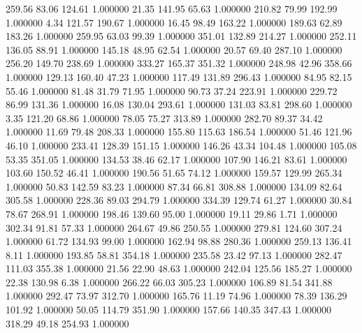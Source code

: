     259.56     83.06    124.61  1.000000
     21.35    141.95     65.63  1.000000
    210.82     79.99    192.99  1.000000
      4.34    121.57    190.67  1.000000
     16.45     98.49    163.22  1.000000
    189.63     62.89    183.26  1.000000
    259.95     63.03     99.39  1.000000
    351.01    132.89    214.27  1.000000
    252.11    136.05     88.91  1.000000
    145.18     48.95     62.54  1.000000
     20.57     69.40    287.10  1.000000
    256.20    149.70    238.69  1.000000
    333.27    165.37    351.32  1.000000
    248.98     42.96    358.66  1.000000
    129.13    160.40     47.23  1.000000
    117.49    131.89    296.43  1.000000
     84.95     82.15     55.46  1.000000
     81.48     31.79     71.95  1.000000
     90.73     37.24    223.91  1.000000
    229.72     86.99    131.36  1.000000
     16.08    130.04    293.61  1.000000
    131.03     83.81    298.60  1.000000
      3.35    121.20     68.86  1.000000
     78.05     75.27    313.89  1.000000
    282.70     89.37     34.42  1.000000
     11.69     79.48    208.33  1.000000
    155.80    115.63    186.54  1.000000
     51.46    121.96     46.10  1.000000
    233.41    128.39    151.15  1.000000
    146.26     43.34    104.48  1.000000
    105.08     53.35    351.05  1.000000
    134.53     38.46     62.17  1.000000
    107.90    146.21     83.61  1.000000
    103.60    150.52     46.41  1.000000
    190.56     51.65     74.12  1.000000
    159.57    129.99    265.34  1.000000
     50.83    142.59     83.23  1.000000
     87.34     66.81    308.88  1.000000
    134.09     82.64    305.58  1.000000
    228.36     89.03    294.79  1.000000
    334.39    129.74     61.27  1.000000
     30.84     78.67    268.91  1.000000
    198.46    139.60     95.00  1.000000
     19.11     29.86      1.71  1.000000
    302.34     91.81     57.33  1.000000
    264.67     49.86    250.55  1.000000
    279.81    124.60    307.24  1.000000
     61.72    134.93     99.00  1.000000
    162.94     98.88    280.36  1.000000
    259.13    136.41      8.11  1.000000
    193.85     58.81    354.18  1.000000
    235.58     23.42     97.13  1.000000
    282.47    111.03    355.38  1.000000
     21.56     22.90     48.63  1.000000
    242.04    125.56    185.27  1.000000
     22.38    130.98      6.38  1.000000
    266.22     66.03    305.23  1.000000
    106.89     81.54    341.88  1.000000
    292.47     73.97    312.70  1.000000
    165.76     11.19     74.96  1.000000
     78.39    136.29    101.92  1.000000
     50.05    114.79    351.90  1.000000
    157.66    140.35    347.43  1.000000
    318.29     49.18    254.93  1.000000
